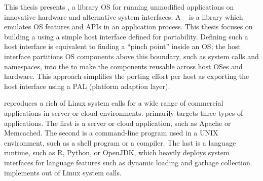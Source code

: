 This thesis presents
{\bf \graphene{}},
a library OS for running unmodified applications on innovative hardware and alternative system interfaces.
A \libos{}
~\cite{porter11drawbridge,engler95exokernel,libra,unikernels}
is a library which emulates OS features and APIs
in an application process.
This thesis focuses on building a \libos{}
using a simple host interface defined for portability.
Defining such a host interface %
is equivalent to
finding a ``pinch point'' inside an OS;
the host interface partitions
OS components above this boundary, such as system calls and namespaces, into the \libos{} to make the components reusable
across host OSes and hardware.
This approach simplifies the porting effort per host
as exporting the host interface using a PAL (platform adaption layer).

\graphene{} reproduces a rich of Linux system calls
for a wide range of commercial applications
in server or cloud environments.
\graphene{} primarily targets three types of applications.
The first is a server or cloud application, such as Apache or Memcached.
The second is a command-line program used in a UNIX environment, such as a shell program or a compiler.
The last is a language runtime, such as R, Python, or OpenJDK,
which heavily deploys
system interfaces for language features
such as dynamic loading and garbage collection. 
\graphene{} implements \graphenesyscallnum{} out of \linuxsyscallnum{} Linux system calls.


